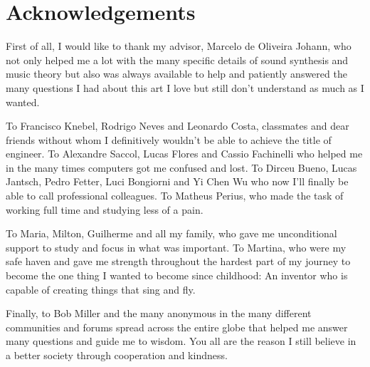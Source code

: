\chapter*{Acknowledgements}

First of all, I would like to thank my advisor, Marcelo de Oliveira Johann, who not only helped me a lot with the many specific details of sound synthesis and music theory but also was always available to help and patiently answered the many questions I had about this art I love but still don't understand as much as I wanted.

To Francisco Knebel, Rodrigo Neves and Leonardo Costa, classmates and dear friends without whom I definitively wouldn't be able to achieve the title of engineer. To Alexandre Saccol, Lucas Flores and Cassio Fachinelli who helped me in the many times computers got me confused and lost. To Dirceu Bueno, Lucas Jantsch, Pedro Fetter, Luci Bongiorni and Yi Chen Wu who now I'll finally be able to call professional colleagues. To Matheus Perius, who made the task of working full time and studying less of a pain.

To Maria, Milton, Guilherme and all my family, who gave me unconditional support to study and focus in what was important. To Martina, who were my safe haven and gave me strength throughout the hardest part of my journey to become the one thing I wanted to become since childhood: An inventor who is capable of creating things that sing and fly.

Finally, to Bob Miller and the many anonymous in the many different communities and forums spread across the entire globe that helped me answer many questions and guide me to wisdom. You all are the reason I still believe in a better society through cooperation and kindness.

\clearpage
